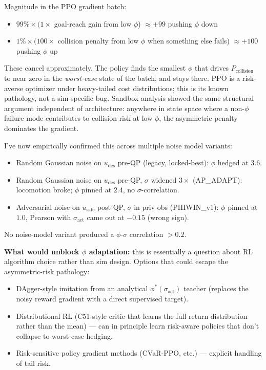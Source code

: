 \documentclass[11pt]{article}
\begin{document}
Magnitude in the PPO gradient batch:
\begin{itemize}
\item $99\% \times (1 \times$ goal-reach gain from low $\phi$) $\approx +99$ pushing $\phi$ down
\item $1\% \times (100 \times$ collision penalty from low $\phi$ when something else fails) $\approx +100$ pushing $\phi$ up
\end{itemize}

These cancel approximately. The policy finds the smallest $\phi$ that drives $P_\text{collision}$ to near zero in the \emph{worst-case} state of the batch, and stays there. PPO is a risk-averse optimizer under heavy-tailed cost distributions; this is its known pathology, not a sim-specific bug. Sandbox analysis showed the same structural argument independent of architecture: anywhere in state space where a non-$\phi$ failure mode contributes to collision risk at low $\phi$, the asymmetric penalty dominates the gradient.

I've now empirically confirmed this across multiple noise model variants:

\begin{itemize}
\item Random Gaussian noise on $u_\text{des}$ pre-QP (legacy, locked-best): $\phi$ hedged at $3.6$.
\item Random Gaussian noise on $u_\text{des}$ pre-QP, $\sigma$ widened $3\times$ (AP\_ADAPT): locomotion broke; $\phi$ pinned at $2.4$, no $\sigma$-correlation.
\item Adversarial noise on $u_\text{safe}$ post-QP, $\sigma$ in priv obs (PHIWIN\_v1): $\phi$ pinned at $1.0$, Pearson with $\sigma_\text{act}$ came out at $-0.15$ (wrong sign).
\end{itemize}

No noise-model variant produced a $\phi$-$\sigma$ correlation $> 0.2$.

\textbf{What would unblock $\phi$ adaptation:} this is essentially a question about RL algorithm choice rather than sim design. Options that could escape the asymmetric-risk pathology:

\begin{itemize}
\item DAgger-style imitation from an analytical $\phi^*(\sigma_\text{act})$ teacher (replaces the noisy reward gradient with a direct supervised target).
\item Distributional RL (C51-style critic that learns the full return distribution rather than the mean) --- can in principle learn risk-aware policies that don't collapse to worst-case hedging.
\item Risk-sensitive policy gradient methods (CVaR-PPO, etc.) --- explicit handling of tail risk.
\end{itemize}
\end{document}
